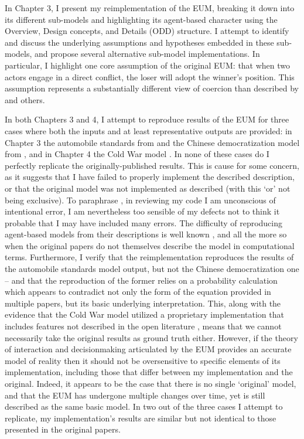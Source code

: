 In Chapter 3, I present my reimplementation of the EUM, breaking it down into its different sub-models and highlighting its agent-based character using the \citet{grimm_2006} Overview, Design concepts, and Details (ODD) structure. I attempt to identify and discuss the underlying assumptions and hypotheses embedded in these sub-models, and propose several alternative sub-model implementations. In particular, I highlight one core assumption of the original EUM: that when two actors engage in a direct conflict, the loser will adopt the winner's position. This assumption represents a substantially different view of coercion than described by \citet{schelling_1966} and others.

In both Chapters 3 and 4, I attempt to reproduce results of the EUM for three cases where both the inputs and at least representative outputs are provided: in Chapter 3 the automobile standards from \citet{bdm_1994} and the Chinese democratization model from \citet{bdm_2002}, and in Chapter 4 the Cold War model \citep{bdm_1998}. In none of these cases do I perfectly replicate the originally-published results. This is cause for some concern, as it suggests that I have failed to properly implement the described description, or that the original model was not implemented as described (with this `or' not being exclusive). To paraphrase \citet{washington_1796}, in reviewing my code I am unconscious of intentional error, I am nevertheless too sensible of my defects not to think it probable that I may have included many errors. The difficulty of reproducing agent-based models from their descriptions is well known \citep{axtell_1996,rand_2007,edmonds_2003}, and all the more so when the original papers do not themselves describe the model in computational terms. Furthermore, I verify that the \citet{scholz_2011} reimplementation reproduces the results of the automobile standards model output, but not the Chinese democratization one -- and that the reproduction of the former relies on a probability calculation which appears to contradict not only the form of the equation provided in multiple papers, but its basic underlying interpretation. This, along with the evidence that the Cold War model utilized a proprietary implementation that includes features not described in the open literature \citep{dii_2011}, means that we cannot necessarily take the original results as ground truth either. However, if the theory of interaction and decisionmaking articulated by the EUM provides an accurate model of reality then it should not be oversensitive to specific elements of its implementation, including those that differ between my implementation and the original. Indeed, it appears to be the case that there is no single `original' model, and that the EUM has undergone multiple changes over time, yet is still described as the same basic model. In two out of the three cases I attempt to replicate, my implementation's results are similar but not identical to those presented in the original papers.

